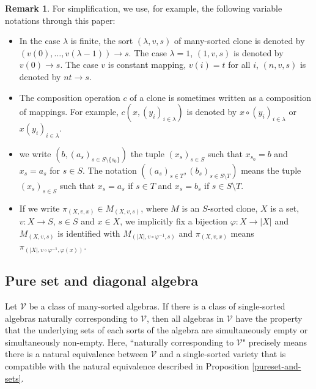 \documentclass[a4paper,10pt]{article}
\theoremstyle{definition}
\newtheorem{rem}[df]{Remark}
\newcommand\ph{\varphi}
\newcommand\ra{\rightarrow}
\newcommand\sm{\setminus}
\newcommand\V{\mathcal{V}}
\begin{document}
\begin{rem}
For simplification, we use, for example, the following variable notations through this paper:
\begin{itemize}
\item
In the case $\lambda$ is finite, the sort $(\lambda,v,s)$ of many-sorted clone is denoted by $(v(0),\dots,v(\lambda-1))\ra s$.
The case $\lambda=1$, $(1,v,s)$ is denoted by $v(0)\ra s$.
The case $v$ is constant mapping, $v(i)=t$ for all $i$, $(n,v,s)$ is denoted by $nt\ra s$.
\item
The composition operation $c$ of a clone is sometimes 
written as a composition of mappings.
For example, $c(x,(y_i)_{i\in\lambda})$ is denoted by
$x\circ(y_i)_{i\in\lambda}$ or $x(y_i)_{i\in \lambda}$.
\item
we write $(b,(a_s)_{s\in S\sm\{s_0\}})$ the tuple $(x_s)_{s\in S}$ such that
$x_{s_0}=b$ and $x_s=a_s$ for $s\in S$.
The notation $((a_s)_{s\in T},(b_s)_{s\in S\sm T})$ means the tuple $(x_s)_{s\in S}$
such that $x_s=a_s$ if $s\in T$ and $x_s=b_s$ if $s\in S\sm T$.
\item
If we write $\pi_{(X,v,x)}\in M_{(X,v,s)}$,
where $M$ is an $S$-sorted clone, $X$ is a set, $v:X\ra S$, $s\in S$ and $x\in X$,
we implicitly fix a bijection $\ph:X\ra |X|$ and
$M_{(X,v,s)}$ is identified with $M_{(|X|,v\circ\ph^{-1},s)}$ and
$\pi_{(X,v,x)}$ means
$\pi_{(|X|,v\circ \ph^{-1},\ph(x))}$.
\end{itemize}
\end{rem}

\subsection{Pure set and diagonal algebra} \label{s-pure-set-and-diagonal-algebra}

Let $\V$ be a class of many-sorted algebras. If there is a class of
single-sorted algebras naturally corresponding to $\V$, then all algebras
in $\V$ have the property that
the underlying sets of each sorts of the algebra are simultaneously empty
or simultaneously non-empty.
Here, ``naturally corresponding to $\V$" precisely means there is a natural equivalence between $\V$ and a single-sorted variety
that is compatible with the natural equivalence described in Proposition \ref{pureset-and-sets}.
\end{document}
